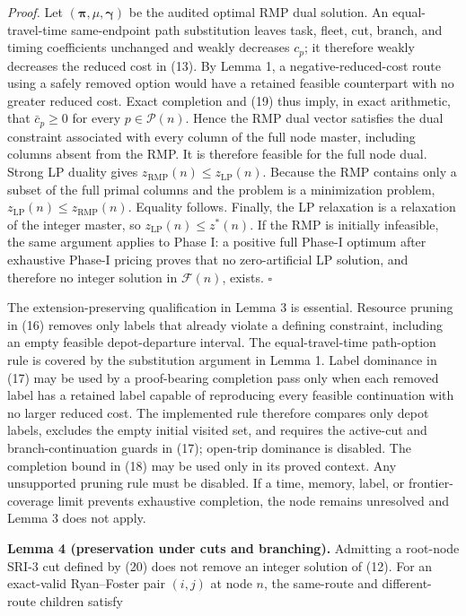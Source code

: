 \documentclass[
  11pt,
]{article}
\begin{document}
\emph{Proof.} Let \((\boldsymbol{\pi},\mu,\boldsymbol{\gamma})\) be the
audited optimal RMP dual solution. An equal-travel-time same-endpoint
path substitution leaves task, fleet, cut, branch, and timing
coefficients unchanged and weakly decreases \(c_p\); it therefore weakly
decreases the reduced cost in (13). By Lemma 1, a negative-reduced-cost
route using a safely removed option would have a retained feasible
counterpart with no greater reduced cost. Exact completion and (19) thus
imply, in exact arithmetic, that \(\bar c_p\ge0\) for every
\(p\in\mathcal{P}(n)\). Hence the RMP dual vector satisfies the dual
constraint associated with every column of the full node master,
including columns absent from the RMP. It is therefore feasible for the
full node dual. Strong LP duality gives
\(z_{\mathrm{RMP}}(n)\le z_{\mathrm{LP}}(n)\). Because the RMP contains
only a subset of the full primal columns and the problem is a
minimization problem, \(z_{\mathrm{LP}}(n)\le z_{\mathrm{RMP}}(n)\).
Equality follows. Finally, the LP relaxation is a relaxation of the
integer master, so \(z_{\mathrm{LP}}(n)\le z^*(n)\). If the RMP is
initially infeasible, the same argument applies to Phase I: a positive
full Phase-I optimum after exhaustive Phase-I pricing proves that no
zero-artificial LP solution, and therefore no integer solution in
\(\mathcal{F}(n)\), exists. \(\square\)

The extension-preserving qualification in Lemma 3 is essential. Resource
pruning in (16) removes only labels that already violate a defining
constraint, including an empty feasible depot-departure interval. The
equal-travel-time path-option rule is covered by the substitution
argument in Lemma 1. Label dominance in (17) may be used by a
proof-bearing completion pass only when each removed label has a
retained label capable of reproducing every feasible continuation with
no larger reduced cost. The implemented rule therefore compares only
depot labels, excludes the empty initial visited set, and requires the
active-cut and branch-continuation guards in (17); open-trip dominance
is disabled. The completion bound in (18) may be used only in its proved
context. Any unsupported pruning rule must be disabled. If a time,
memory, label, or frontier-coverage limit prevents exhaustive
completion, the node remains unresolved and Lemma 3 does not apply.

\textbf{Lemma 4 (preservation under cuts and branching).} Admitting a
root-node SRI-3 cut defined by (20) does not remove an integer solution
of (12). For an exact-valid Ryan--Foster pair \((i,j)\) at node \(n\),
the same-route and different-route children satisfy
\end{document}
